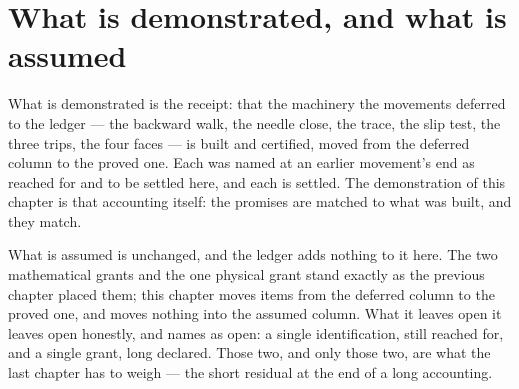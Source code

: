 \section{What is demonstrated, and what is assumed}
\label{se:demonstrated-assumed-V2}

What is demonstrated is the receipt: that the machinery the movements deferred to the ledger --- the backward
walk, the needle close, the trace, the slip test, the three trips, the four faces --- is built and certified,
moved from the deferred column to the proved one. Each was named at an earlier movement's end as reached for
and to be settled here, and each is settled. The demonstration of this chapter is that accounting itself:
the promises are matched to what was built, and they match.

What is assumed is unchanged, and the ledger adds nothing to it here. The two mathematical grants and the one
physical grant stand exactly as the previous chapter placed them; this chapter moves items from the deferred
column to the proved one, and moves nothing into the assumed column. What it leaves open it leaves open
honestly, and names as open: a single identification, still reached for, and a single grant, long declared.
Those two, and only those two, are what the last chapter has to weigh --- the short residual at the end of a
long accounting.
